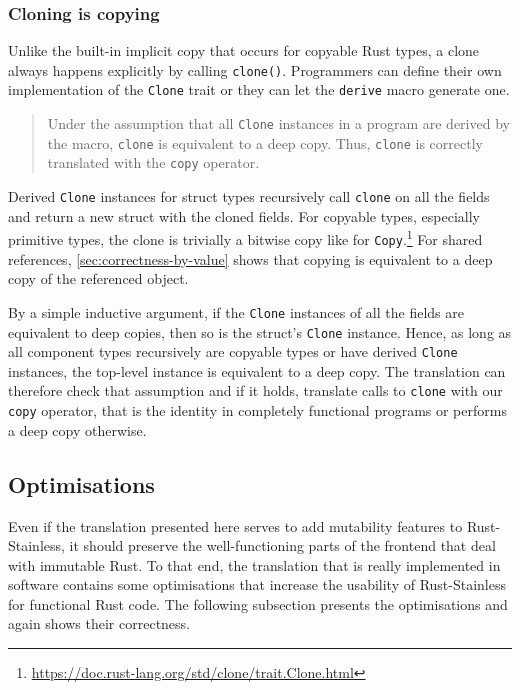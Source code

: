 \subsubsection{Cloning is copying}
\label{sec:clone-is-copy}

Unlike the built-in implicit copy that occurs for copyable Rust types, a clone
always happens explicitly by calling \lstinline!clone()!. Programmers can define
their own implementation of the \lstinline!Clone! trait or they can let the
\lstinline!derive! macro generate one.

\begin{quote}
Under the assumption that all \lstinline!Clone! instances in a program are
derived by the macro, \lstinline!clone! is equivalent to a deep copy. Thus,
\lstinline!clone! is correctly translated with the \lstinline!copy! operator.
\end{quote}

Derived \lstinline!Clone! instances for struct types recursively call
\lstinline!clone! on all the fields and return a new struct with the cloned
fields. For copyable types, especially primitive types, the clone is trivially a
bitwise copy like for
\lstinline!Copy!.\footnote{\url{https://doc.rust-lang.org/std/clone/trait.Clone.html}}
For shared references, \autoref{sec:correctness-by-value} shows that copying is
equivalent to a deep copy of the referenced object.

By a simple inductive argument, if the \lstinline!Clone! instances of all the
fields are equivalent to deep copies, then so is the struct's \lstinline!Clone!
instance. Hence, as long as all component types recursively are copyable types
or have derived \lstinline!Clone! instances, the top-level instance is
equivalent to a deep copy. The translation can therefore check that assumption
and if it holds, translate calls to \lstinline!clone! with our \lstinline!copy!
operator, that is the identity in completely functional programs or performs a
deep copy otherwise.



\subsection{Optimisations}
\label{optimisations}

Even if the translation presented here serves to add mutability features to
Rust-Stainless, it should preserve the well-functioning parts of the frontend
that deal with immutable Rust. To that end, the translation that is really
implemented in software contains some optimisations that increase the usability
of Rust-Stainless for functional Rust code. The following subsection presents
the optimisations and again shows their correctness.


